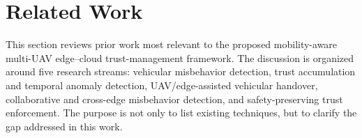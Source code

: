 \documentclass[journal]{IEEEtran}
\begin{document}
%






\section{Related Work}
\label{sec:related_work}

This section reviews prior work most relevant to the proposed mobility-aware multi-UAV edge--cloud trust-management framework. The discussion is organized around five research streams: vehicular misbehavior detection, trust accumulation and temporal anomaly detection, UAV/edge-assisted vehicular handover, collaborative and cross-edge misbehavior detection, and safety-preserving trust enforcement. The purpose is not only to list existing techniques, but to clarify the gap addressed in this work.
\end{document}
